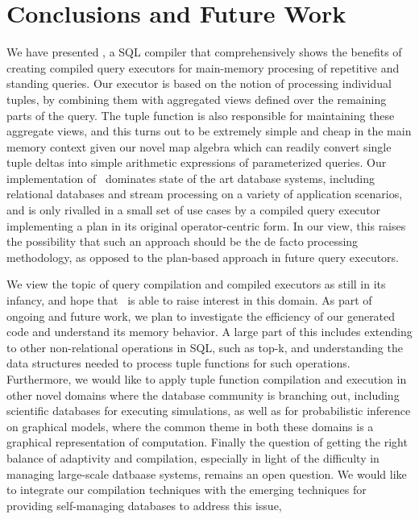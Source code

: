 \section{Conclusions and Future Work}

We have presented \compiler, a SQL compiler that comprehensively shows the
benefits of creating compiled query executors for main-memory procesing of
repetitive and standing queries. Our executor is based on the notion of
processing individual tuples, by combining them with aggregated views defined
over the remaining parts of the query. The tuple function is also responsible for
maintaining these aggregate views, and this turns out to be extremely simple and
cheap in the main memory context given our novel map algebra which can readily
convert single tuple deltas into simple arithmetic expressions of parameterized
queries. Our implementation of \compiler\ dominates state of the art database
systems, including relational databases and stream processing on a variety of
application scenarios, and is only rivalled in a small set of use cases by a
compiled query executor implementing a plan in its original operator-centric
form. In our view, this raises the possibility that such an approach should be
the de facto processing methodology, as opposed to the plan-based approach in
future query executors.

We view the topic of query compilation and compiled executors as still in its
infancy, and hope that \compiler\ is able to raise interest in this domain. 
As part of ongoing and future work, we plan to investigate the efficiency of
our generated code and understand its memory behavior. A large part of this
includes extending to other non-relational operations in SQL, such as top-k,
and understanding the data structures needed to process tuple functions for
such operations. Furthermore, we would like to apply tuple function
compilation and execution in other novel domains where the database
community is branching out, including scientific databases for executing
simulations, as well as for probabilistic inference on graphical models, where
the common theme in both these domains is a graphical representation of 
computation. Finally the question of getting the right balance of adaptivity
and compilation, especially in light of the difficulty in managing large-scale
datbaase systems, remains an open question. We would like to integrate our
compilation techniques with the emerging techniques for providing self-managing
databases to address this issue,

